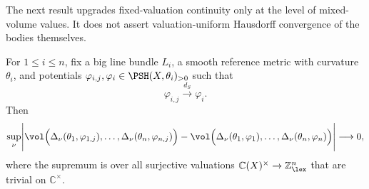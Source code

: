 \documentclass[11pt,a4paper]{amsart}
\newcommand{\dS}{d_{S}}
\begin{document}
The next result upgrades fixed-valuation continuity only at the level of mixed-volume values.  It does not assert valuation-uniform Hausdorff convergence of the bodies themselves.

\begin{proposition}\label{prop:uniform-dS}
For $1\leq i\leq n$, fix a big line bundle $L_i$, a smooth reference metric with curvature $\theta_i$, and potentials
$\varphi_{i,j},\varphi_i\in\PSH(X,\theta_i)_{>0}$ such that
\[
 \varphi_{i,j}\xrightarrow{\dS}\varphi_i.
\]
Then
\begin{equation}\label{eq:uniform-dS}
 \sup_\nu\Biggl|
 \vol\Bigl(\Delta_\nu(\theta_1,\varphi_{1,j}),\ldots,\Delta_\nu(\theta_n,\varphi_{n,j})\Bigr)-\vol\Bigl(\Delta_\nu(\theta_1,\varphi_1),\ldots,\Delta_\nu(\theta_n,\varphi_n)\Bigr)\Biggr|\longrightarrow 0,
\end{equation}
where the supremum is over all surjective valuations $\mathbb C(X)^\times\to\mathbb Z^n_{\lex}$ that are trivial on $\mathbb C^\times$.
\end{proposition}
\end{document}
